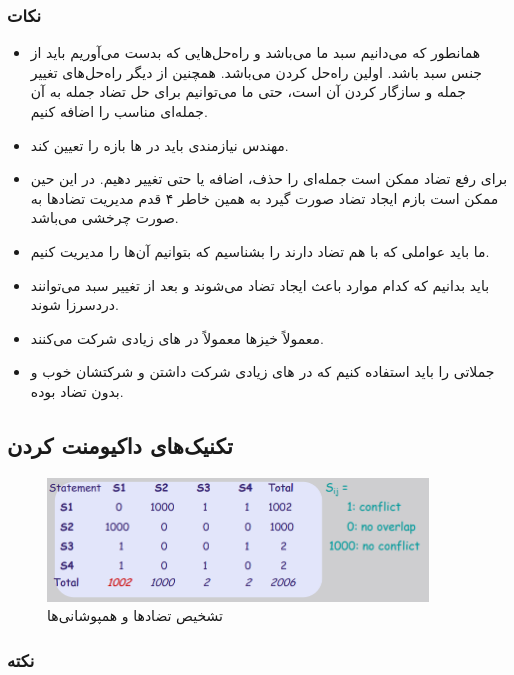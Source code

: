 \subsubsection*{نکات}

\begin{itemize}
    \item همانطور که می‌دانیم  سبد ما می‌باشد و راه‌حل‌هایی که
    بدست می‌آوریم باید از جنس سبد باشد. اولین راه‌حل  کردن می‌باشد.
    همچنین از دیگر راه‌حل‌های تغییر جمله و سازگار کردن آن است، حتی ما می‌توانیم
    برای حل تضاد جمله به آن جمله‌ای مناسب را اضافه کنیم.
    \item مهندس نیازمندی باید در ها بازه را تعیین کند.
    \item برای رفع تضاد ممکن است جمله‌ای را حذف، اضافه یا حتی تغییر دهیم. در این
    حین ممکن است بازم ایجاد تضاد صورت گیرد به همین خاطر ۴ قدم مدیریت تضاد‌ها به
    صورت چرخشی می‌باشد.
    \item ما باید عواملی که با هم تضاد دارند را بشناسیم که بتوانیم آن‌ها را
    مدیریت کنیم.
    \item باید بدانیم که کدام موارد باعث ایجاد تضاد می‌شوند و بعد از تغییر سبد
    می‌توانند دردسرزا شوند.
    \item معمولاً خیز‌ها معمولاً در های زیادی شرکت
    می‌کنند.
    \item جملاتی را باید استفاده کنیم که در های زیادی شرکت داشتن و
    شرکتشان خوب و بدون تضاد بوده.
\end{itemize}

\subsection{تکنیک‌های داکیومنت کردن}

\begin{figure}[H]
    \centering
    \includegraphics[width=0.9\textwidth]{images/systematic_process_table.png}
    \caption{تشخیص تضاد‌ها و همپوشانی‌ها}
\end{figure}

\subsubsection*{نکته}

